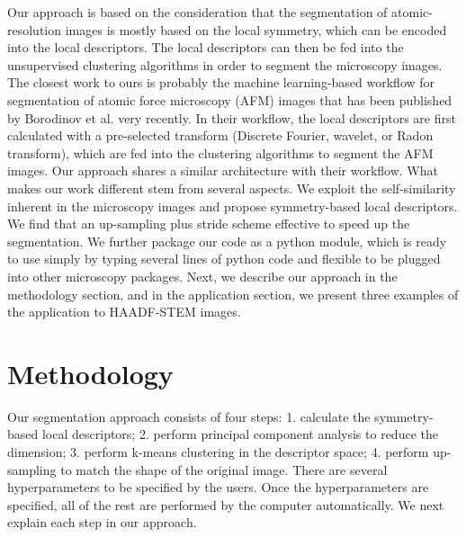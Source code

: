 \documentclass[twocolumn,amsmath, floatfix]{revtex4}
\begin{document}
Our approach is based on the consideration that the segmentation of atomic-resolution images is mostly based on the local symmetry, which can be encoded into the local descriptors. The local descriptors can then be fed into the unsupervised clustering algorithms in order to segment the microscopy images. The closest work to ours is probably the machine learning-based workflow for segmentation of atomic force microscopy (AFM) images that has been published by Borodinov et al.\cite{Borodinov2020} very recently.  In their workflow, the local descriptors are first calculated with a pre-selected transform (Discrete Fourier, wavelet, or Radon transform), which are fed into the clustering algorithms to segment the AFM images. Our approach shares a similar architecture with their workflow. What makes our work different stem from several aspects. We exploit the self-similarity inherent in the microscopy images and propose symmetry-based local descriptors. We find that an up-sampling plus stride scheme effective to speed up the segmentation. We further package our code as a python module, which is ready to use simply by typing several lines of python code and flexible to be plugged into other microscopy packages.   Next, we describe our approach in the methodology section, and in the application section, we present three examples of the application to HAADF-STEM images.

\section{Methodology}
Our segmentation approach consists of four steps: 1. calculate the symmetry-based local descriptors; 2. perform principal component analysis to reduce the dimension; 3. perform k-means clustering in the descriptor space; 4. perform up-sampling to match the shape of the original image. There are several hyperparameters to be specified by the users. %
Once the hyperparameters are specified, all of the rest are performed by the computer automatically. We next explain each step in our approach. 
\end{document}
